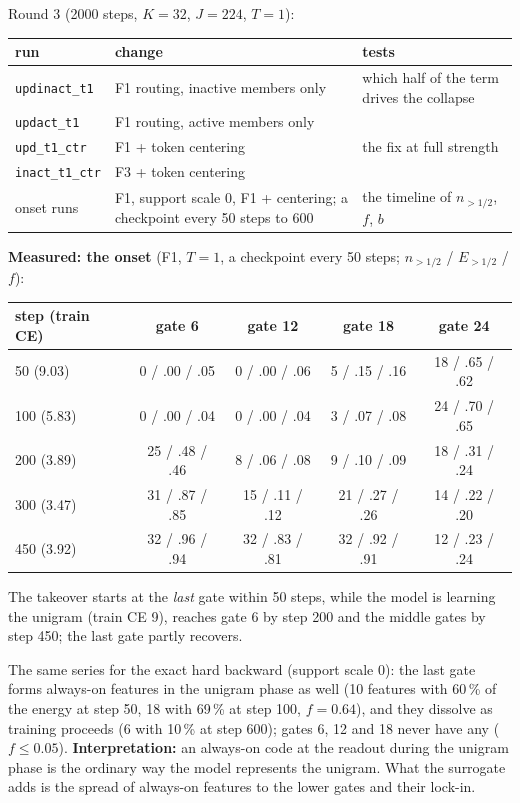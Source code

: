 \documentclass[11pt,a4paper]{article}
\newcommand{\code}[1]{\texttt{#1}}
\begin{document}
Round 3 (2000 steps, \(K=32\), \(J=224\), \(T=1\)):

\begin{center}\small
\begin{tabular}{lll}
\toprule
run & change & tests \\
\midrule
\code{updinact\_t1} & F1 routing, inactive members only & which half of the term drives the collapse \\
\code{updact\_t1} & F1 routing, active members only & \\
\code{upd\_t1\_ctr} & F1 + token centering & the fix at full strength \\
\code{inact\_t1\_ctr} & F3 + token centering & \\
onset runs & F1, support scale 0, F1 + centering; a checkpoint every 50 steps to 600 & the timeline of \(n_{>1/2}\), \(f\), \(b\) \\
\bottomrule
\end{tabular}
\end{center}

\textbf{Measured: the onset} (F1, \(T=1\), a checkpoint every 50 steps; \(n_{>1/2}\) / \(E_{>1/2}\) / \(f\)):

\begin{center}\small
\begin{tabular}{lcccc}
\toprule
step (train CE) & gate 6 & gate 12 & gate 18 & gate 24 \\
\midrule
50 (9.03)   & 0 / .00 / .05  & 0 / .00 / .06  & 5 / .15 / .16  & 18 / .65 / .62 \\
100 (5.83)  & 0 / .00 / .04  & 0 / .00 / .04  & 3 / .07 / .08  & 24 / .70 / .65 \\
200 (3.89)  & 25 / .48 / .46 & 8 / .06 / .08  & 9 / .10 / .09  & 18 / .31 / .24 \\
300 (3.47)  & 31 / .87 / .85 & 15 / .11 / .12 & 21 / .27 / .26 & 14 / .22 / .20 \\
450 (3.92)  & 32 / .96 / .94 & 32 / .83 / .81 & 32 / .92 / .91 & 12 / .23 / .24 \\
\bottomrule
\end{tabular}
\end{center}

The takeover starts at the \emph{last} gate within 50 steps, while the model is learning the unigram (train CE 9),
reaches gate 6 by step 200 and the middle gates by step 450; the last gate partly recovers.

The same series for the exact hard backward (support scale 0): the last gate forms always-on features in the
unigram phase as well (10 features with 60\,\% of the energy at step 50, 18 with 69\,\% at step 100, \(f=0.64\)), and
they dissolve as training proceeds (6 with 10\,\% at step 600); gates 6, 12 and 18 never have any (\(f\le0.05\)).
\textbf{Interpretation:} an always-on code at the readout during the unigram phase is the ordinary way the model
represents the unigram.  What the surrogate adds is the spread of always-on features to the lower gates and their
lock-in.
\end{document}
